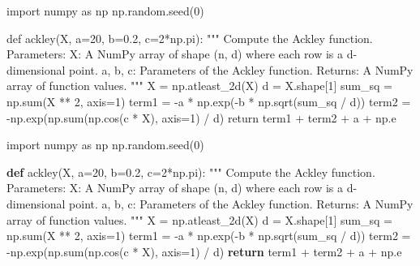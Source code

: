 \documentclass[
  letterpaper,
  numbers=noenddot,
  DIV=11]{scrreprt}
\newenvironment{Shaded}{\begin{snugshade}}{\end{snugshade}}
\newcommand{\BuiltInTok}[1]{\textcolor[rgb]{0.00,0.23,0.31}{#1}}
\newcommand{\CommentTok}[1]{\textcolor[rgb]{0.37,0.37,0.37}{#1}}
\newcommand{\ControlFlowTok}[1]{\textcolor[rgb]{0.00,0.23,0.31}{\textbf{#1}}}
\newcommand{\DecValTok}[1]{\textcolor[rgb]{0.68,0.00,0.00}{#1}}
\newcommand{\FloatTok}[1]{\textcolor[rgb]{0.68,0.00,0.00}{#1}}
\newcommand{\ImportTok}[1]{\textcolor[rgb]{0.00,0.46,0.62}{#1}}
\newcommand{\KeywordTok}[1]{\textcolor[rgb]{0.00,0.23,0.31}{\textbf{#1}}}
\newcommand{\NormalTok}[1]{\textcolor[rgb]{0.00,0.23,0.31}{#1}}
\newcommand{\OperatorTok}[1]{\textcolor[rgb]{0.37,0.37,0.37}{#1}}
\theoremstyle{plain}
\theoremstyle{definition}
\theoremstyle{remark}
\begin{document}
\begin{tcolorbox}[colframe=.grey, title=\faCode \enspace Code]

\begin{Shaded}
\begin{Highlighting}[numbers=left,,]
\NormalTok{import numpy as np}
\NormalTok{np.random.seed(0)}

\NormalTok{def ackley(X, a=20, b=0.2, c=2*np.pi):}
\NormalTok{    """}
\NormalTok{    Compute the Ackley function.}
\NormalTok{    Parameters:}
\NormalTok{      X: A NumPy array of shape (n, d) where each row is a d{-}dimensional point.}
\NormalTok{      a, b, c: Parameters of the Ackley function.}
\NormalTok{    Returns:}
\NormalTok{      A NumPy array of function values.}
\NormalTok{    """}
\NormalTok{    X = np.atleast\_2d(X)}
\NormalTok{    d = X.shape[1]}
\NormalTok{    sum\_sq = np.sum(X ** 2, axis=1)}
\NormalTok{    term1 = {-}a * np.exp({-}b * np.sqrt(sum\_sq / d))}
\NormalTok{    term2 = {-}np.exp(np.sum(np.cos(c * X), axis=1) / d)}
\NormalTok{    return term1 + term2 + a + np.e}
\end{Highlighting}
\end{Shaded}

\end{tcolorbox}

\begin{Shaded}
\begin{Highlighting}[numbers=left,,]
\ImportTok{import}\NormalTok{ numpy }\ImportTok{as}\NormalTok{ np}
\NormalTok{np.random.seed(}\DecValTok{0}\NormalTok{)}

\KeywordTok{def}\NormalTok{ ackley(X, a}\OperatorTok{=}\DecValTok{20}\NormalTok{, b}\OperatorTok{=}\FloatTok{0.2}\NormalTok{, c}\OperatorTok{=}\DecValTok{2}\OperatorTok{*}\NormalTok{np.pi):}
    \CommentTok{"""}
\CommentTok{    Compute the Ackley function.}
\CommentTok{    Parameters:}
\CommentTok{      X: A NumPy array of shape (n, d) where each row is a d{-}dimensional point.}
\CommentTok{      a, b, c: Parameters of the Ackley function.}
\CommentTok{    Returns:}
\CommentTok{      A NumPy array of function values.}
\CommentTok{    """}
\NormalTok{    X }\OperatorTok{=}\NormalTok{ np.atleast\_2d(X)}
\NormalTok{    d }\OperatorTok{=}\NormalTok{ X.shape[}\DecValTok{1}\NormalTok{]}
\NormalTok{    sum\_sq }\OperatorTok{=}\NormalTok{ np.}\BuiltInTok{sum}\NormalTok{(X }\OperatorTok{**} \DecValTok{2}\NormalTok{, axis}\OperatorTok{=}\DecValTok{1}\NormalTok{)}
\NormalTok{    term1 }\OperatorTok{=} \OperatorTok{{-}}\NormalTok{a }\OperatorTok{*}\NormalTok{ np.exp(}\OperatorTok{{-}}\NormalTok{b }\OperatorTok{*}\NormalTok{ np.sqrt(sum\_sq }\OperatorTok{/}\NormalTok{ d))}
\NormalTok{    term2 }\OperatorTok{=} \OperatorTok{{-}}\NormalTok{np.exp(np.}\BuiltInTok{sum}\NormalTok{(np.cos(c }\OperatorTok{*}\NormalTok{ X), axis}\OperatorTok{=}\DecValTok{1}\NormalTok{) }\OperatorTok{/}\NormalTok{ d)}
    \ControlFlowTok{return}\NormalTok{ term1 }\OperatorTok{+}\NormalTok{ term2 }\OperatorTok{+}\NormalTok{ a }\OperatorTok{+}\NormalTok{ np.e}
\end{Highlighting}
\end{Shaded}
\end{document}
